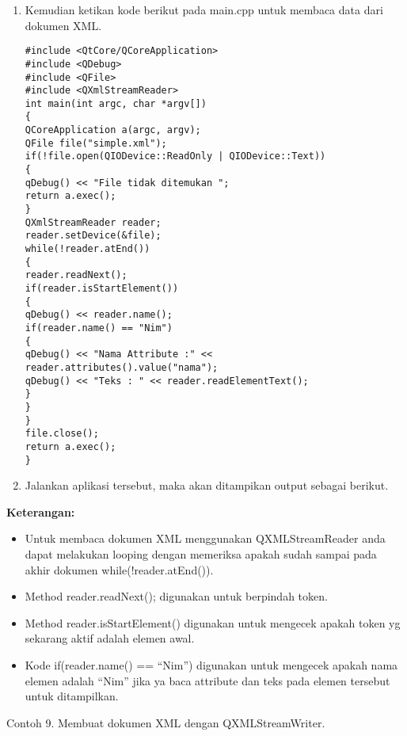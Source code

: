 \begin{enumerate}
\def\labelenumi{\arabic{enumi}.}
\setcounter{enumi}{2}
\item
  Kemudian ketikan kode berikut pada main.cpp untuk membaca data dari
  dokumen XML.

\begin{verbatim}
#include <QtCore/QCoreApplication>
#include <QDebug>
#include <QFile>
#include <QXmlStreamReader>
int main(int argc, char *argv[])
{
QCoreApplication a(argc, argv);
QFile file("simple.xml");
if(!file.open(QIODevice::ReadOnly | QIODevice::Text))
{
qDebug() << "File tidak ditemukan ";
return a.exec();
}
QXmlStreamReader reader;
reader.setDevice(&file);
while(!reader.atEnd())
{
reader.readNext();
if(reader.isStartElement())
{
qDebug() << reader.name();
if(reader.name() == "Nim")
{
qDebug() << "Nama Attribute :" << reader.attributes().value("nama");
qDebug() << "Teks : " << reader.readElementText();
}
}
}
file.close();
return a.exec();
}
\end{verbatim}
\item
  Jalankan aplikasi tersebut, maka akan ditampikan output sebagai
  berikut.
\end{enumerate}

\textbf{Keterangan:}

\begin{itemize}
\tightlist
\item
  Untuk membaca dokumen XML menggunakan QXMLStreamReader anda dapat
  melakukan looping dengan memeriksa apakah sudah sampai pada akhir
  dokumen while(!reader.atEnd()).
\item
  Method reader.readNext(); digunakan untuk berpindah token.
\item
  Method reader.isStartElement() digunakan untuk mengecek apakah token
  yg sekarang aktif adalah elemen awal.
\item
  Kode if(reader.name() == ``Nim'') digunakan untuk mengecek apakah nama
  elemen adalah ``Nim'' jika ya baca attribute dan teks pada elemen
  tersebut untuk ditampilkan.
\end{itemize}

Contoh 9. Membuat dokumen XML dengan QXMLStreamWriter.

